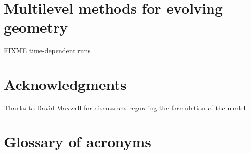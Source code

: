 \documentclass[letterpaper,final,12pt,reqno]{amsart}
\theoremstyle{claim}
\numberwithin{equation}{section}
\numberwithin{figure}{section}
\numberwithin{table}{section}
\numberwithin{theorem}{section}
\begin{document}
\section{Multilevel methods for evolving geometry} \label{sec:evolution}

FIXME time-dependent runs


\section*{Acknowledgments}  Thanks to David Maxwell for discussions regarding the formulation of the model.

\small

\bigskip



\appendix

\section{Glossary of acronyms} \label{app:glossary}
\end{document}
